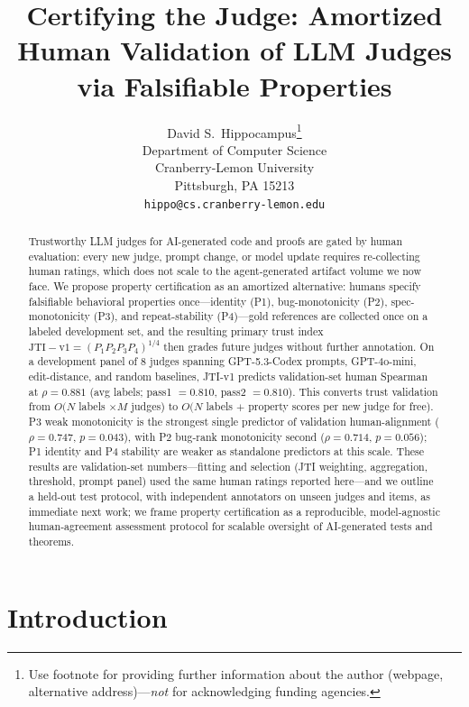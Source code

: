 \documentclass{article}
\title{Certifying the Judge: Amortized Human Validation of LLM Judges via Falsifiable Properties}
\author{%
  David S.~Hippocampus\thanks{Use footnote for providing further information
    about the author (webpage, alternative address)---\emph{not} for acknowledging
    funding agencies.} \\
  Department of Computer Science\\
  Cranberry-Lemon University\\
  Pittsburgh, PA 15213 \\
  \texttt{hippo@cs.cranberry-lemon.edu} \\
}
\begin{document}
\maketitle

\begin{abstract}
  Trustworthy LLM judges for AI-generated code and proofs are gated by human evaluation: every new judge, prompt change, or model update requires re-collecting human ratings, which does not scale to the agent-generated artifact volume we now face.
  We propose property certification as an amortized alternative: humans specify falsifiable behavioral properties once---identity (P1), bug-monotonicity (P2), spec-monotonicity (P3), and repeat-stability (P4)---gold references are collected once on a labeled development set, and the resulting primary trust index \( \mathrm{JTI\!-\!v1}=(P_1P_2P_3P_4)^{1/4}\) then grades future judges without further annotation.
  On a development panel of 8 judges spanning GPT-5.3-Codex prompts, GPT-4o-mini, edit-distance, and random baselines, JTI-v1 predicts validation-set human Spearman at \(\rho=0.881\) (avg labels; pass1 \(=0.810\), pass2 \(=0.810\)).
  This converts trust validation from \(O(N\) labels \(\times M\) judges) to \(O(N\) labels \(+\) property scores per new judge for free).
  P3 weak monotonicity is the strongest single predictor of validation human-alignment (\(\rho = 0.747\), \(p = 0.043\)), with P2 bug-rank monotonicity second (\(\rho = 0.714\), \(p = 0.056\)); P1 identity and P4 stability are weaker as standalone predictors at this scale.
  These results are validation-set numbers---fitting and selection (JTI weighting, aggregation, threshold, prompt panel) used the same human ratings reported here---and we outline a held-out test protocol, with independent annotators on unseen judges and items, as immediate next work; we frame property certification as a reproducible, model-agnostic human-agreement assessment protocol for scalable oversight of AI-generated tests and theorems.
\end{abstract}

\section{Introduction}
\end{document}
